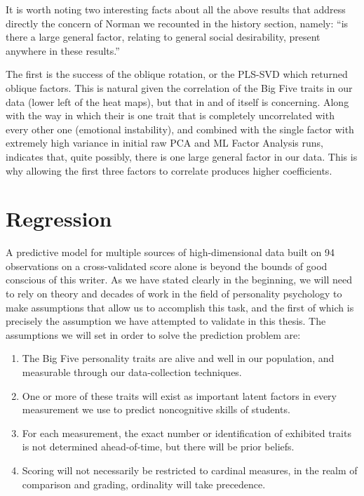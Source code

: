 \documentclass[a4paper,12pt]{article}
\begin{document}
It is worth noting two interesting facts about all the above results that address directly the concern of Norman we recounted in the history section, namely: ``is there a large general factor, relating to general social desirability, present anywhere in these results.''

The first is the success of the oblique rotation, or the PLS-SVD which returned oblique factors. This is natural given the correlation of the Big Five traits in our data (lower left of the heat maps), but that in and of itself is concerning. Along with the way in which their is one trait that is completely uncorrelated with every other one (emotional instability), and combined with the single factor with extremely high variance in initial raw PCA and ML Factor Analysis runs, indicates that, quite possibly, there is one large general factor in our data. This is why allowing the first three factors to correlate produces higher coefficients.


\section{Regression}

A predictive model for multiple sources of high-dimensional data built on 94 observations on a cross-validated score alone is beyond the bounds of good conscious of this writer. As we have stated clearly in the beginning, we will need to rely on theory and decades of work in the field of personality psychology to make assumptions that allow us to accomplish this task, and the first of which is precisely the assumption we have attempted to validate in this thesis. The assumptions we will set in order to solve the prediction problem are:

\begin{enumerate}
\item The Big Five personality traits are alive and well in our population, and measurable through our data-collection techniques.

\item One or more of these traits will exist as important latent factors in every measurement we use to predict noncognitive skills of students.

\item For each measurement, the exact number or identification of exhibited traits is not determined ahead-of-time, but there will be prior beliefs.

\item Scoring will not necessarily be restricted to cardinal measures, in the realm of comparison and grading, ordinality will take precedence.
\end{enumerate}
\end{document}
